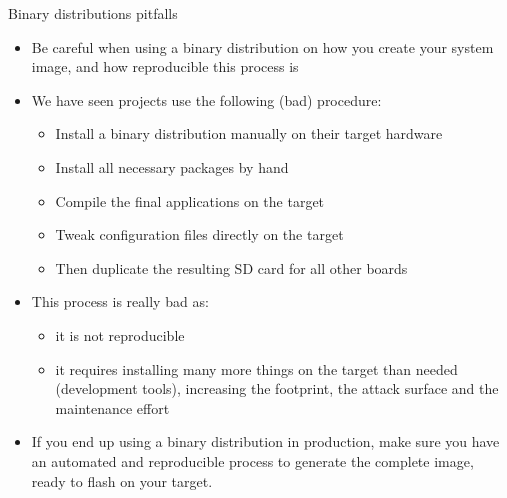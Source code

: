 \begin{frame}{Binary distributions pitfalls}
  \begin{itemize}
  \item Be careful when using a binary distribution on how you create
    your system image, and how reproducible this process is
  \item We have seen projects use the following (bad) procedure:
    \begin{itemize}
    \item Install a binary distribution manually on their target hardware
    \item Install all necessary packages by hand
    \item Compile the final applications on the target
    \item Tweak configuration files directly on the target
    \item Then duplicate the resulting SD card for all other boards
    \end{itemize}
  \item This process is really bad as:
    \begin{itemize}
    \item it is not reproducible
    \item it requires installing many more things on the target than
      needed (development tools), increasing the footprint, the attack
      surface and the maintenance effort
    \end{itemize}
  \item If you end up using a binary distribution in production, make
    sure you have an automated and reproducible process to generate
    the complete image, ready to flash on your target.
  \end{itemize}
\end{frame}


